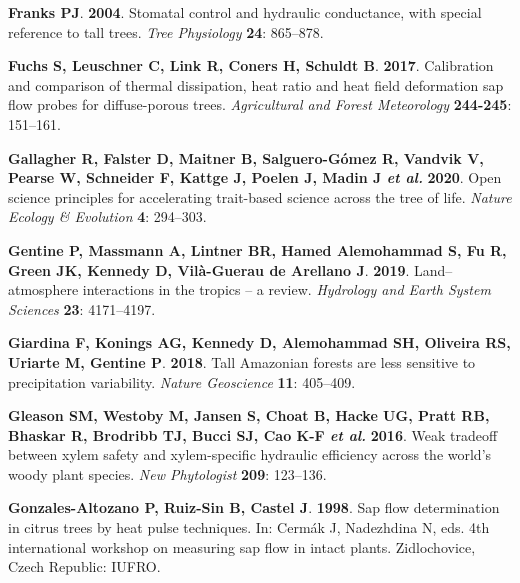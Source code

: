 \documentclass[11pt,twoside]{reedthesis}
\begin{document}
\hypertarget{ref-Franks2004}{}
\textbf{\textnormal{Franks PJ}}. \textbf{2004}. Stomatal control and
hydraulic conductance, with special reference to tall trees. \emph{Tree
Physiology} \textbf{24}: 865--878.

\hypertarget{ref-Fuchs2017}{}
\textbf{\textnormal{Fuchs S}, \textnormal{Leuschner C}, \textnormal{Link
R}, \textnormal{Coners H}, \textnormal{Schuldt B}}. \textbf{2017}.
Calibration and comparison of thermal dissipation, heat ratio and heat
field deformation sap flow probes for diffuse-porous trees.
\emph{Agricultural and Forest Meteorology} \textbf{244-245}: 151--161.

\hypertarget{ref-Gallagher2020}{}
\textbf{\textnormal{Gallagher R}, \textnormal{Falster D},
\textnormal{Maitner B}, \textnormal{Salguero-Gómez R},
\textnormal{Vandvik V}, \textnormal{Pearse W}, \textnormal{Schneider F},
\textnormal{Kattge J}, \textnormal{Poelen J}, \textnormal{Madin J}
\emph{et al.}} \textbf{2020}. Open science principles for accelerating
trait-based science across the tree of life. \emph{Nature Ecology \&
Evolution} \textbf{4}: 294--303.

\hypertarget{ref-gentine_landatmosphere_2019}{}
\textbf{\textnormal{Gentine P}, \textnormal{Massmann A},
\textnormal{Lintner BR}, \textnormal{Hamed Alemohammad S},
\textnormal{Fu R}, \textnormal{Green JK}, \textnormal{Kennedy D},
\textnormal{Vilà-Guerau de Arellano J}}. \textbf{2019}. Land--atmosphere
interactions in the tropics -- a review. \emph{Hydrology and Earth
System Sciences} \textbf{23}: 4171--4197.

\hypertarget{ref-giardina_tall_2018}{}
\textbf{\textnormal{Giardina F}, \textnormal{Konings AG},
\textnormal{Kennedy D}, \textnormal{Alemohammad SH},
\textnormal{Oliveira RS}, \textnormal{Uriarte M}, \textnormal{Gentine
P}}. \textbf{2018}. Tall Amazonian forests are less sensitive to
precipitation variability. \emph{Nature Geoscience} \textbf{11}:
405--409.

\hypertarget{ref-gleason_weak_2016}{}
\textbf{\textnormal{Gleason SM}, \textnormal{Westoby M},
\textnormal{Jansen S}, \textnormal{Choat B}, \textnormal{Hacke UG},
\textnormal{Pratt RB}, \textnormal{Bhaskar R}, \textnormal{Brodribb TJ},
\textnormal{Bucci SJ}, \textnormal{Cao K-F} \emph{et al.}}
\textbf{2016}. Weak tradeoff between xylem safety and xylem-specific
hydraulic efficiency across the world's woody plant species. \emph{New
Phytologist} \textbf{209}: 123--136.

\hypertarget{ref-Gonzales-Altozano1998}{}
\textbf{\textnormal{Gonzales-Altozano P}, \textnormal{Ruiz-Sin B},
\textnormal{Castel J}}. \textbf{1998}. Sap flow determination in citrus
trees by heat pulse techniques. In: Cermák J, Nadezhdina N, eds. 4th
international workshop on measuring sap flow in intact plants.
Zidlochovice, Czech Republic: IUFRO.
\end{document}

